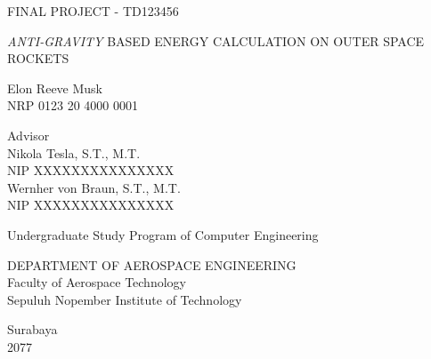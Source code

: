 \begin{large}
  FINAL PROJECT - TD123456
\end{large}

\vspace{\fill}

\begin{spacing}{1.5}
  \begin{Large}
    \emph{ANTI-GRAVITY} BASED ENERGY CALCULATION ON OUTER SPACE ROCKETS
  \end{Large}
\end{spacing}

\vspace{\fill}

\begin{large}
  Elon Reeve Musk \\
  \textmd{NRP 0123 20 4000 0001}
\end{large}

\vspace{\fill}

\begin{large}
  \textmd{Advisor} \\
  Nikola Tesla, S.T., M.T. \\
  \textmd{NIP XXXXXXXXXXXXXXX} \\
  Wernher von Braun, S.T., M.T. \\
  \textmd{NIP XXXXXXXXXXXXXXX}
\end{large}

\vspace{\fill}

Undergraduate Study Program of Computer Engineering \\

\mdseries

DEPARTMENT OF AEROSPACE ENGINEERING \\
Faculty of Aerospace Technology \\
Sepuluh Nopember Institute of Technology

Surabaya \\
2077

